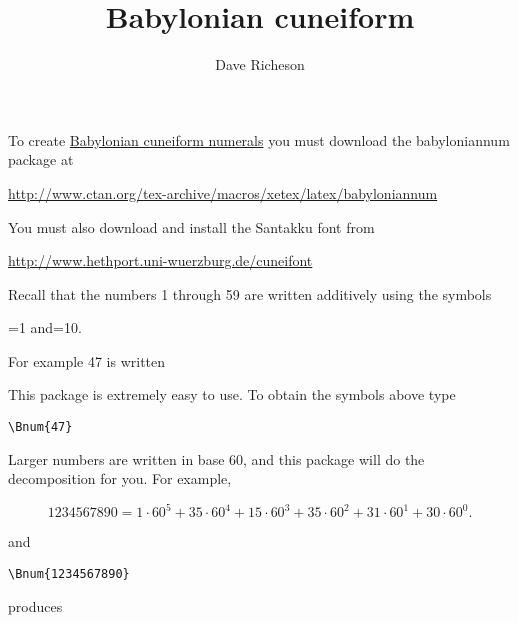 \documentclass[12pt]{amsart}
\newcommand{\Bnum}[1]{{\LARGE \babyloniannum{#1}}}
\begin{document}
\title{Babylonian cuneiform}
\author{Dave Richeson}

\maketitle

To create \href{http://en.wikipedia.org/wiki/Babylonian_numerals}{Babylonian cuneiform numerals} you must download the babyloniannum package at 

\href{http://www.ctan.org/tex-archive/macros/xetex/latex/babyloniannum}{http://www.ctan.org/tex-archive/macros/xetex/latex/babyloniannum}

You must also download and install the Santakku font from 

\href{http://www.hethport.uni-wuerzburg.de/cuneifont}{http://www.hethport.uni-wuerzburg.de/cuneifont}

Recall that the numbers 1 through 59 are written additively using the symbols 

\begin{center}
\Bnum{1}=1 and\Bnum{10}=10.
\end{center}

For example 47 is written 

\begin{center}
\Bnum{47}
\end{center}

This package is extremely easy to use. To obtain the symbols above type

\verb#\Bnum{47}#

Larger numbers are written in base 60, and this package will do the decomposition for you. For example, 

\[1234567890=1 \cdot 60^{5}+35 \cdot 60^{4}+15 \cdot 60^{3}+35 \cdot 60^{2}+31 \cdot 60^{1}+30 \cdot 60^{0}.\]

and 

\verb#\Bnum{1234567890}#

produces 

\begin{center}
\Bnum{1234567890}
\end{center}
\end{document}
